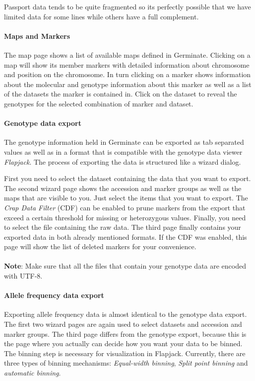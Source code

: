 Passport data tends to be quite fragmented so its perfectly possible that we have limited data for some lines while others have a full complement.

\paragraph{Maps and Markers}
The map page shows a list of available maps defined in Germinate. Clicking on a map will show its member markers with detailed information about chromosome and position on the chromosome. In turn clicking on a marker shows information about the molecular and genotype information about this marker as well as a list of the datasets the marker is contained in. Click on the dataset to reveal the genotypes for the selected combination of marker and dataset.

\paragraph{Genotype data export}
The genotype information held in Germinate can be exported as tab separated values as well as in a format that is compatible with the genotype data viewer \textit{Flapjack}. The process of exporting the data is structured like a wizard dialog.

First you need to select the dataset containing the data that you want to export. The second wizard page shows the accession and marker groups as well as the maps that are visible to you. Just select the items that you want to export. The \textit{Crap Data Filter} (CDF) can be enabled to prune markers from the export that exceed a certain threshold for missing or heterozygous values.
Finally, you need to select the file containing the raw data. The third page finally contains your exported data in both already mentioned formats. If the CDF was enabled, this page will show the list of deleted markers for your convenience.\\
\\
\textbf{Note}: Make sure that all the files that contain your genotype data are encoded with UTF-8.

\paragraph{Allele frequency data export}
Exporting allele frequency data is almost identical to the genotype data export. The first two wizard pages are again used to select datasets and accession and marker groups. The third page differs from the genotype export, because this is the page where you actually can decide how you want your data to be binned. The binning step is necessary for visualization in Flapjack. Currently, there are three types of binning mechanisms: \textit{Equal-width binning}, \textit{Split point binning} and \textit{automatic binning}.

